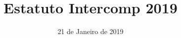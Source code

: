 \documentclass[11pt]{report}
\title{Estatuto Intercomp 2019}
\date{21 de Janeiro de 2019}
\begin{document}





\noindent
\tableofcontents
\newpage


















\end{document}
